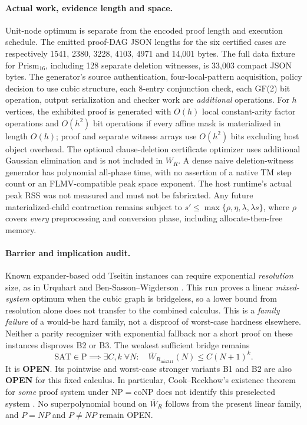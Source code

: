 \documentclass[11pt]{article}
\begin{document}
\paragraph{Actual work, evidence length and space.}
Unit-node optimum is separate from the encoded proof length and execution schedule. The emitted proof-DAG JSON lengths for the six certified cases are respectively 1541, 2380, 3228, 4103, 4971 and 14,001 bytes. The full data fixture for Prism$_{16}$, including 128 separate deletion witnesses, is 33,003 compact JSON bytes. The generator's source authentication, four-local-pattern acquisition, policy decision to use cubic structure, each 8-entry conjunction check, each GF(2) bit operation, output serialization and checker work are \emph{additional} operations. For $h$ vertices, the exhibited proof is generated with $O(h)$ local constant-arity factor operations and $O(h^2)$ bit operations if every affine mask is materialized in length $O(h)$; proof and separate witness arrays use $O(h^2)$ bits excluding host object overhead. The optional clause-deletion certificate optimizer uses additional Gaussian elimination and is not included in $W_R$. A dense naive deletion-witness generator has polynomial all-phase time, with no assertion of a native TM step count or an FLMV-compatible peak space exponent. The host runtime's actual peak RSS was not measured and must not be fabricated. Any future materialized-child contraction remains subject to $s'\le\max\{\rho,\eta,\lambda,\lambda s\}$, where $\rho$ covers \emph{every} preprocessing and conversion phase, including allocate-then-free memory.

\paragraph{Barrier and implication audit.}
Known expander-based odd Tseitin instances can require exponential \emph{resolution} size, as in Urquhart and Ben-Sasson--Wigderson \cite{Urquhart1987,BenSassonWigderson2001}. This run proves a linear \emph{mixed-system} optimum when the cubic graph is bridgeless, so a lower bound from resolution alone does not transfer to the combined calculus. This is a \emph{family failure} of a would-be hard family, not a disproof of worst-case hardness elsewhere. Neither a parity recognizer with exponential fallback nor a short proof on these instances disproves B2 or B3.
The weakest sufficient bridge remains
\[
 \mathrm{SAT}\in\mathrm{P}\implies \exists C,k\;\forall N:\quad
 \overline W_{R_{\mathrm{mix341}}}(N)\le C(N+1)^k.
\]
It is \textbf{OPEN}. Its pointwise and worst-case stronger variants B1 and B2 are also \textbf{OPEN} for this fixed calculus. In particular, Cook--Reckhow's existence theorem for \emph{some} proof system under $\mathrm{NP}=\mathrm{coNP}$ does not identify this preselected system \cite{CookReckhow1979}. No superpolynomial bound on $\overline W_R$ follows from the present linear family, and $P=NP$ and $P\ne NP$ remain OPEN.
\end{document}
